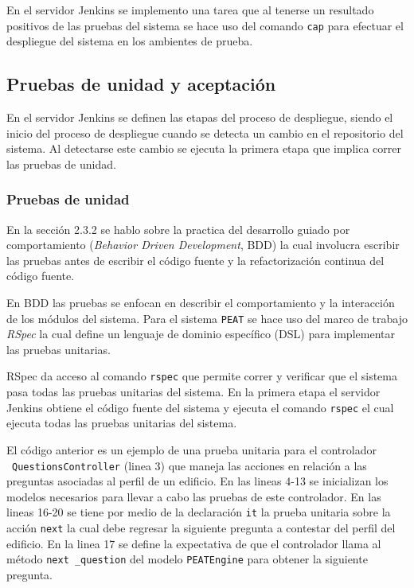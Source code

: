 En el servidor Jenkins se implemento una tarea que al tenerse un resultado
positivos de las pruebas del sistema se hace uso del comando \texttt{cap}
para efectuar el despliegue del sistema en los ambientes de prueba.

\subsection{Pruebas de unidad y aceptación}

En el servidor Jenkins se definen las etapas del proceso de despliegue, siendo
el inicio del proceso de despliegue cuando se detecta un cambio en el repositorio
del sistema. Al detectarse este cambio se ejecuta la primera etapa que implica
correr las pruebas de unidad.

\subsubsection{Pruebas de unidad}

En la sección 2.3.2 se hablo sobre la practica del desarrollo guiado por
comportamiento (\textit{Behavior Driven Development}, BDD) la cual involucra
escribir las pruebas antes de escribir el código fuente y la refactorización
continua del código fuente.

En BDD las pruebas se enfocan en describir el comportamiento y la interacción
de los módulos del sistema. Para el sistema \texttt{PEAT} se hace uso del marco
de trabajo \textit{RSpec} la cual define un lenguaje de dominio específico (DSL)
para implementar las pruebas unitarias.

RSpec da acceso al comando \texttt{rspec} que permite correr y verificar
que el sistema pasa todas las pruebas unitarias del sistema. En la primera
etapa el servidor Jenkins obtiene el código fuente del sistema y ejecuta el
comando \texttt{rspec} el cual ejecuta todas las pruebas unitarias del sistema.



El código anterior es un ejemplo de una prueba unitaria para el controlador
\ \texttt{QuestionsController} (linea 3) que maneja las acciones en relación
a las preguntas asociadas al perfil de un edificio. En las lineas 4-13 se
inicializan los modelos necesarios para llevar a cabo las pruebas de este
controlador.
En las lineas 16-20 se tiene por medio de la declaración \texttt{it} la
prueba unitaria sobre la acción \texttt{next} la cual debe regresar
la siguiente pregunta a contestar del perfil del edificio. En la linea
17 se define la expectativa de que el controlador llama al método \texttt{next
  \_question} del modelo \texttt{PEATEngine} para obtener la siguiente pregunta.

